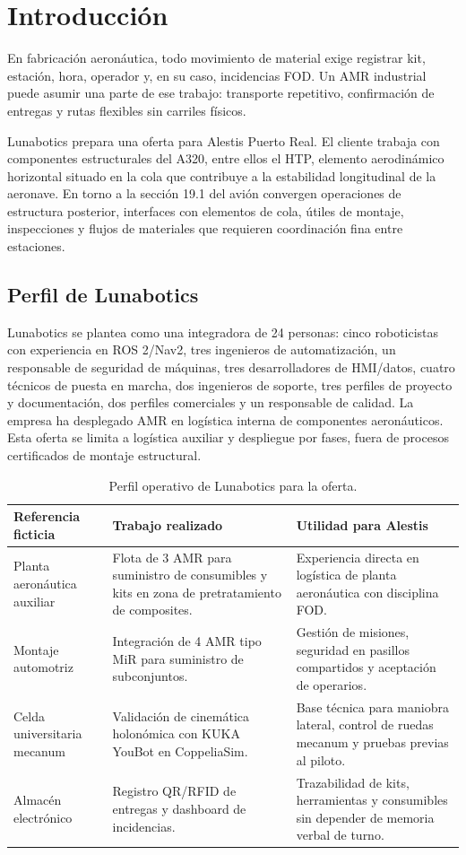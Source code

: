 \chapter{Introducción}

En fabricación aeronáutica, todo movimiento de material exige registrar kit, estación, hora, operador y, en su caso, incidencias FOD. Un AMR industrial puede asumir una parte de ese trabajo: transporte repetitivo, confirmación de entregas y rutas flexibles sin carriles físicos.

Lunabotics prepara una oferta para Alestis Puerto Real. El cliente trabaja con componentes estructurales del A320, entre ellos el HTP, elemento aerodinámico horizontal situado en la cola que contribuye a la estabilidad longitudinal de la aeronave. En torno a la sección 19.1 del avión convergen operaciones de estructura posterior, interfaces con elementos de cola, útiles de montaje, inspecciones y flujos de materiales que requieren coordinación fina entre estaciones.

\section{Perfil de Lunabotics}

Lunabotics se plantea como una integradora de 24 personas: cinco roboticistas con experiencia en ROS 2/Nav2, tres ingenieros de automatización, un responsable de seguridad de máquinas, tres desarrolladores de HMI/datos, cuatro técnicos de puesta en marcha, dos ingenieros de soporte, tres perfiles de proyecto y documentación, dos perfiles comerciales y un responsable de calidad. La empresa ha desplegado AMR en logística interna de componentes aeronáuticos. Esta oferta se limita a logística auxiliar y despliegue por fases, fuera de procesos certificados de montaje estructural.

\begin{table}[H]
\centering
\begin{tabularx}{\textwidth}{P{0.23\textwidth}P{0.35\textwidth}X}
\toprule
Referencia ficticia & Trabajo realizado & Utilidad para Alestis\\
\midrule
Planta aeronáutica auxiliar & Flota de 3 AMR para suministro de consumibles y kits en zona de pretratamiento de composites. & Experiencia directa en logística de planta aeronáutica con disciplina FOD.\\
Montaje automotriz & Integración de 4 AMR tipo MiR para suministro de subconjuntos. & Gestión de misiones, seguridad en pasillos compartidos y aceptación de operarios.\\
Celda universitaria mecanum & Validación de cinemática holonómica con KUKA YouBot en CoppeliaSim. & Base técnica para maniobra lateral, control de ruedas mecanum y pruebas previas al piloto.\\
Almacén electrónico & Registro QR/RFID de entregas y dashboard de incidencias. & Trazabilidad de kits, herramientas y consumibles sin depender de memoria verbal de turno.\\
\bottomrule
\end{tabularx}
\caption{Perfil operativo de Lunabotics para la oferta.}
\label{tab:perfil-lunabotics}
\end{table}

